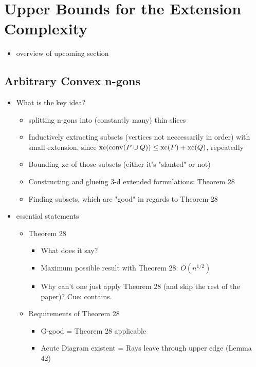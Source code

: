 \section{Upper Bounds for the Extension Complexity}

\begin{itemize}
  \item overview of upcoming section
\end{itemize}



\subsection{Arbitrary Convex n-gons}

\begin{itemize}
  \item What is the key idea? 
  \begin{itemize}
    \item splitting n-gons into (constantly many) thin slices
    \item Inductively extracting subsets (vertices not neccessarily in order) with small extension, since $\operatorname{xc}(\operatorname{conv}(P \cup Q)) \leq \operatorname{xc}(P) + \operatorname{xc}(Q)$, repeatedly
    \item Bounding $\operatorname{xc}$ of those subsets (either it's "slanted" or not)
    \item Constructing and glueing 3-d extended formulations: Theorem 28
    \item Finding subsets, which are "good" in regards to Theorem 28
  \end{itemize}
  \item essential statements
  \begin{itemize}
    \item Theorem 28
    \begin{itemize}
      \item What does it say?
      \item Maximum possible result with Theorem 28: $O(n^{1/2})$
      \item Why can't one just apply Theorem 28 (and skip the rest of the paper)? Cue: contains.
    \end{itemize}
    \item Requirements of Theorem 28
    \begin{itemize}
      \item G-good = Theorem 28 applicable
      \item Acute Diagram existent = Rays leave through upper edge (Lemma 42)

\end{itemize}
\end{itemize}
\end{itemize}
